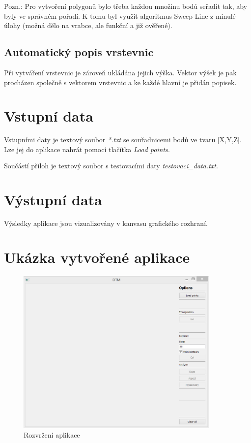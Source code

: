 \documentclass[a4paper, 12pt]{article}
\begin{document}
Pozn.: Pro vytvoření polygonů bylo třeba každou množinu bodů seřadit tak, aby byly ve správném pořadí. K tomu byl využit algoritmus Sweep Line z minulé úlohy (možná dělo na vrabce, ale funkční a již ověřené).

\subsection{Automatický popis vrstevnic}
Při vytváření vrstevnic je zároveň ukládána jejich výška. Vektor výšek je pak procházen společně s vektorem vrstevnic a ke každé hlavní je přidán popisek.

\clearpage


\section{Vstupní data}

Vstupními daty je textový soubor \textit{*.txt} se souřadnicemi bodů ve tvaru [X,Y,Z]. Lze jej do aplikace nahrát pomocí tlačítka \textit{Load points}.

Součástí příloh je textový soubor s testovacími daty \textit{testovaci\_data.txt}.

\section{Výstupní data}
Výsledky aplikace jsou vizualizovány v kanvasu grafického rozhraní.


\clearpage

\section{Ukázka vytvořené aplikace}


\begin{figure}[h]
	\centering
	\includegraphics[width=10cm]{aplikace.jpg}
	\caption{Rozvržení aplikace}
\end{figure}
\end{document}
